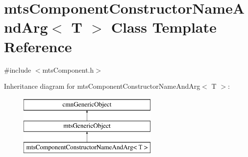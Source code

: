 \hypertarget{classmts_component_constructor_name_and_arg}{}\section{mts\+Component\+Constructor\+Name\+And\+Arg$<$ T $>$ Class Template Reference}
\label{classmts_component_constructor_name_and_arg}


{\ttfamily \#include $<$mts\+Component.\+h$>$}

Inheritance diagram for mts\+Component\+Constructor\+Name\+And\+Arg$<$ T $>$\+:\begin{figure}[H]
\begin{center}
\leavevmode
\includegraphics[height=3.000000cm]{d5/dd4/classmts_component_constructor_name_and_arg}
\end{center}
\end{figure}

